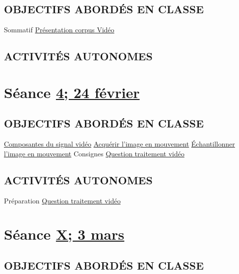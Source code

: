 \documentclass[
  french,
]{book}
\begin{document}
\hypertarget{objectifs-aborduxe9s-en-classe-2}{%
\subsection{OBJECTIFS ABORDÉS EN CLASSE}\label{objectifs-aborduxe9s-en-classe-2}}

Sommatif \protect\hyperlink{sommatif_1}{Présentation corpus Vidéo}

\hypertarget{activituxe9s-autonomes-2}{%
\subsection{ACTIVITÉS AUTONOMES}\label{activituxe9s-autonomes-2}}

\hypertarget{semaine_4}{%
\section{\texorpdfstring{Séance \protect\hyperlink{semaine_4}{4; 24 février}}{Séance 4; 24 février}}\label{semaine_4}}

\hypertarget{objectifs-aborduxe9s-en-classe-3}{%
\subsection{OBJECTIFS ABORDÉS EN CLASSE}\label{objectifs-aborduxe9s-en-classe-3}}

\protect\hyperlink{lexique}{Composantes du signal vidéo}
\protect\hyperlink{acquerir}{Acquérir l'image en mouvement}
\protect\hyperlink{echantillonner}{Échantillonner l'image en mouvement}
Consignes \protect\hyperlink{sommatif_2}{Question traitement vidéo}

\hypertarget{activituxe9s-autonomes-3}{%
\subsection{ACTIVITÉS AUTONOMES}\label{activituxe9s-autonomes-3}}

Préparation \protect\hyperlink{sommatif_2}{Question traitement vidéo}

\hypertarget{semaine_5}{%
\section{\texorpdfstring{Séance \protect\hyperlink{semaine_5}{X; 3 mars}}{Séance X; 3 mars}}\label{semaine_5}}

\hypertarget{objectifs-aborduxe9s-en-classe-4}{%
\subsection{OBJECTIFS ABORDÉS EN CLASSE}\label{objectifs-aborduxe9s-en-classe-4}}
\end{document}
